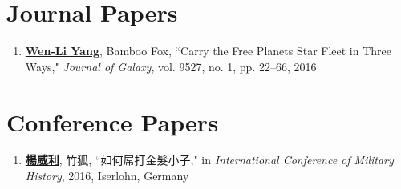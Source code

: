 \begin{publications}%


\section*{Journal Papers}
\begin{spacing}{1}
\begin{enumerate}

\item {\bf \underline{Wen-Li Yang}}, Bamboo Fox, ``Carry the Free Planets Star Fleet in Three Ways," \textit{Journal of Galaxy}, vol. 9527, no. 1, pp. 22--66, 2016

\end{enumerate}
\end{spacing}


\section*{Conference Papers}
\begin{spacing}{1}
\begin{enumerate}

\item {\bf \underline{楊威利}}, 竹狐, ``如何屌打金髮小子," in \textit{International Conference of Military History}, 2016, Iserlohn, Germany

\end{enumerate}
\end{spacing}


\end{publications}